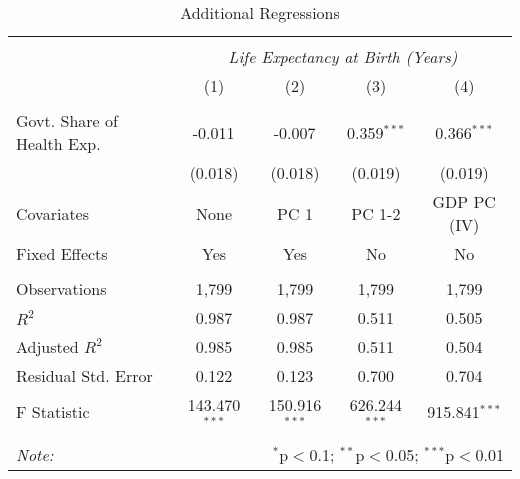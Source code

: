 \begin{table}[!htbp] \centering
  \caption{Additional Regressions \label{additional_regs}}
\begin{tabular}{@{\extracolsep{5pt}}lcccc}
\\[-1.8ex]\hline
\hline \\[-1.8ex]
& \multicolumn{4}{c}{\textit{Life Expectancy at Birth (Years)}} \
\cr \
\\[-1.8ex] & (1) & (2) & (3) & (4) \\
\hline \\[-1.8ex]
 Govt. Share of Health Exp. & -0.011$^{}$ & -0.007$^{}$ & 0.359$^{***}$ & 0.366$^{***}$ \\
  & (0.018) & (0.018) & (0.019) & (0.019) \\
 Covariates & None & PC 1 & PC 1-2 & GDP PC (IV) \\
 Fixed Effects & Yes & Yes & No & No \\
\hline \\[-1.8ex]
 Observations & 1,799 & 1,799 & 1,799 & 1,799 \\
 $R^2$ & 0.987 & 0.987 & 0.511 & 0.505 \\
 Adjusted $R^2$ & 0.985 & 0.985 & 0.511 & 0.504 \\
 Residual Std. Error & 0.122 & 0.123 & 0.700 & 0.704  \\
 F Statistic & 143.470$^{***}$  & 150.916$^{***}$  & 626.244$^{***}$  & 915.841$^{***}$  \\
\hline
\hline \\[-1.8ex]
\textit{Note:} & \multicolumn{4}{r}{$^{*}$p$<$0.1; $^{**}$p$<$0.05; $^{***}$p$<$0.01} \\
\end{tabular}
\end{table}